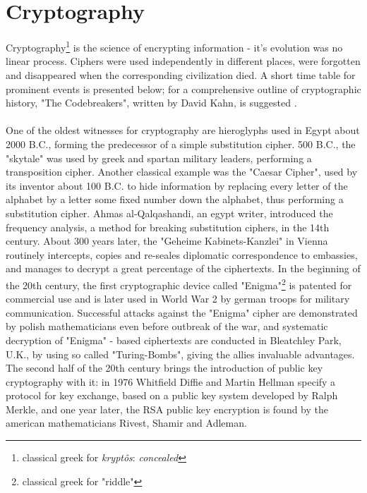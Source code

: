 \section{Cryptography}

Cryptography\footnote{classical greek for \textit{krypt\^{o}s}: \textit{concealed}}
is the science of encrypting information - it's evolution was no linear process. Ciphers were used independently in different
places, were forgotten and disappeared when the corresponding civilization died.
A short time table for prominent events is presented below; for a comprehensive outline of cryptographic history, "The Codebreakers", written by David Kahn,
is suggested \cite{codebreakers}.
\\
\\
One of the oldest witnesses for cryptography are hieroglyphs used in Egypt about 2000 B.C., forming the predecessor
of a simple substitution cipher. 500 B.C., the "skytale" was used by greek and spartan military leaders, performing a transposition cipher. Another classical
example was the "Caesar Cipher", used by its inventor about 100 B.C. to hide information by replacing every letter of the alphabet by a letter some fixed number down the alphabet,
thus performing a substitution cipher. Ahmas al-Qalqashandi, an egypt writer, introduced the frequency analysis, a method for breaking substitution ciphers,
in the 14th century. About 300 years later, the "Geheime Kabinets-Kanzlei" in Vienna routinely intercepts, copies and 
 re-seales diplomatic correspondence to embassies, and manages to decrypt a great percentage of the ciphertexts. In the beginning of the 20th century, the 
 first cryptographic device called "Enigma"\footnote{classical greek for "riddle"} is patented for commercial use and is later used in World War 2 by german troops for 
 military communication. Successful attacks against the "Enigma" cipher are demonstrated by polish mathematicians even before outbreak of the war, and systematic
 decryption of "Enigma" - based ciphertexts are conducted in Bleatchley Park, U.K., by using so called "Turing-Bombs", giving the allies invaluable advantages.
The second half of the 20th century brings the introduction of public key cryptography with it: in 1976 Whitfield Diffie and Martin Hellman specify a 
protocol for key exchange, based on a public key system developed by Ralph Merkle, and one year later, the RSA public key encryption is found by the american
mathematicians Rivest, Shamir and Adleman.
\\

